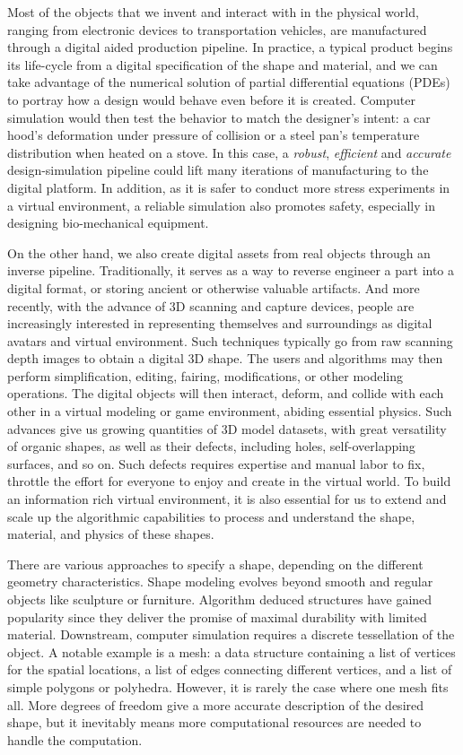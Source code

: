 Most of the objects that we invent and interact with in the physical world, ranging from electronic devices to transportation vehicles, are manufactured through a digital aided production pipeline.
In practice, a typical product begins its life-cycle from a digital specification of the shape and material, 
and we can take advantage of the numerical solution of partial differential equations (PDEs) to portray how a design would behave even before it is created.
Computer simulation would then test the behavior to match the designer's intent: a car hood's deformation under pressure of collision or a steel pan's temperature distribution when heated on a stove. In this case, a \emph{robust}, \emph{efficient} and \emph{accurate} design-simulation pipeline could lift many iterations of manufacturing to the digital platform. In addition, as it is safer to conduct more stress experiments in a virtual environment, a reliable simulation also promotes safety, especially in designing bio-mechanical equipment.

On the other hand, we also create digital assets from real objects through an inverse pipeline. Traditionally, it serves as a way to reverse engineer a part into a digital format, or storing ancient or otherwise valuable artifacts. And more recently, with the advance of 3D scanning and capture devices, people are increasingly interested in representing themselves and surroundings as digital avatars and virtual environment. Such techniques typically go from raw scanning depth images to obtain a digital 3D shape. The users and algorithms may then perform simplification, editing, fairing, modifications, or other modeling operations. The digital objects will then interact, deform, and collide with each other in a virtual modeling or game environment, abiding essential physics.
Such advances give us growing quantities of 3D model datasets, with great versatility of organic shapes, as well as their defects, including holes, self-overlapping surfaces, and so on. Such defects requires expertise and manual labor to fix, throttle the effort for everyone to enjoy and create in the virtual world. To build an information rich virtual environment, it is also essential for us to extend and scale up the algorithmic capabilities to process and understand the shape, material, and physics of these shapes.

There are various approaches to specify a shape, depending on the different geometry characteristics. Shape modeling evolves beyond smooth and regular objects like sculpture or furniture. Algorithm deduced structures have gained popularity since they deliver the promise of maximal durability with limited material. Downstream, computer simulation requires a discrete tessellation of the object. A notable example is a mesh: a data structure containing a list of vertices for the spatial locations, a list of edges connecting different vertices, and a list of simple polygons or polyhedra. However, it is rarely the case where one mesh fits all. More degrees of freedom give a more accurate description of the desired shape, but it inevitably means more computational resources are needed to handle the computation.

